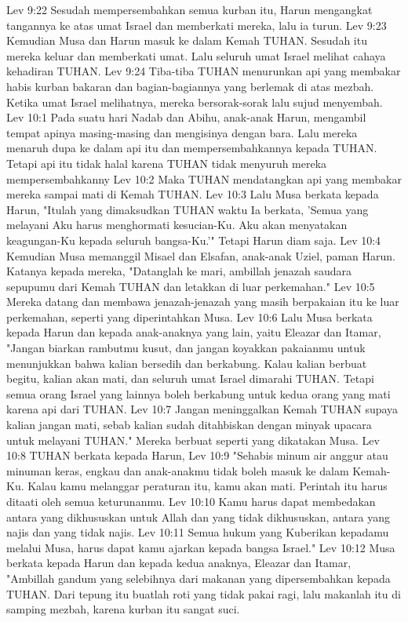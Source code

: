 Lev 9:22  Sesudah mempersembahkan semua kurban itu, Harun mengangkat tangannya ke atas umat Israel dan memberkati mereka, lalu ia turun.
Lev 9:23  Kemudian Musa dan Harun masuk ke dalam Kemah TUHAN. Sesudah itu mereka keluar dan memberkati umat. Lalu seluruh umat Israel melihat cahaya kehadiran TUHAN.
Lev 9:24  Tiba-tiba TUHAN menurunkan api yang membakar habis kurban bakaran dan bagian-bagiannya yang berlemak di atas mezbah. Ketika umat Israel melihatnya, mereka bersorak-sorak lalu sujud menyembah.
Lev 10:1  Pada suatu hari Nadab dan Abihu, anak-anak Harun, mengambil tempat apinya masing-masing dan mengisinya dengan bara. Lalu mereka menaruh dupa ke dalam api itu dan mempersembahkannya kepada TUHAN. Tetapi api itu tidak halal karena TUHAN tidak menyuruh mereka mempersembahkanny
Lev 10:2  Maka TUHAN mendatangkan api yang membakar mereka sampai mati di Kemah TUHAN.
Lev 10:3  Lalu Musa berkata kepada Harun, "Itulah yang dimaksudkan TUHAN waktu Ia berkata, 'Semua yang melayani Aku harus menghormati kesucian-Ku. Aku akan menyatakan keagungan-Ku kepada seluruh bangsa-Ku.'" Tetapi Harun diam saja.
Lev 10:4  Kemudian Musa memanggil Misael dan Elsafan, anak-anak Uziel, paman Harun. Katanya kepada mereka, "Datanglah ke mari, ambillah jenazah saudara sepupumu dari Kemah TUHAN dan letakkan di luar perkemahan."
Lev 10:5  Mereka datang dan membawa jenazah-jenazah yang masih berpakaian itu ke luar perkemahan, seperti yang diperintahkan Musa.
Lev 10:6  Lalu Musa berkata kepada Harun dan kepada anak-anaknya yang lain, yaitu Eleazar dan Itamar, "Jangan biarkan rambutmu kusut, dan jangan koyakkan pakaianmu untuk menunjukkan bahwa kalian bersedih dan berkabung. Kalau kalian berbuat begitu, kalian akan mati, dan seluruh umat Israel dimarahi TUHAN. Tetapi semua orang Israel yang lainnya boleh berkabung untuk kedua orang yang mati karena api dari TUHAN.
Lev 10:7  Jangan meninggalkan Kemah TUHAN supaya kalian jangan mati, sebab kalian sudah ditahbiskan dengan minyak upacara untuk melayani TUHAN." Mereka berbuat seperti yang dikatakan Musa.
Lev 10:8  TUHAN berkata kepada Harun,
Lev 10:9  "Sehabis minum air anggur atau minuman keras, engkau dan anak-anakmu tidak boleh masuk ke dalam Kemah-Ku. Kalau kamu melanggar peraturan itu, kamu akan mati. Perintah itu harus ditaati oleh semua keturunanmu.
Lev 10:10  Kamu harus dapat membedakan antara yang dikhususkan untuk Allah dan yang tidak dikhususkan, antara yang najis dan yang tidak najis.
Lev 10:11  Semua hukum yang Kuberikan kepadamu melalui Musa, harus dapat kamu ajarkan kepada bangsa Israel."
Lev 10:12  Musa berkata kepada Harun dan kepada kedua anaknya, Eleazar dan Itamar, "Ambillah gandum yang selebihnya dari makanan yang dipersembahkan kepada TUHAN. Dari tepung itu buatlah roti yang tidak pakai ragi, lalu makanlah itu di samping mezbah, karena kurban itu sangat suci.
